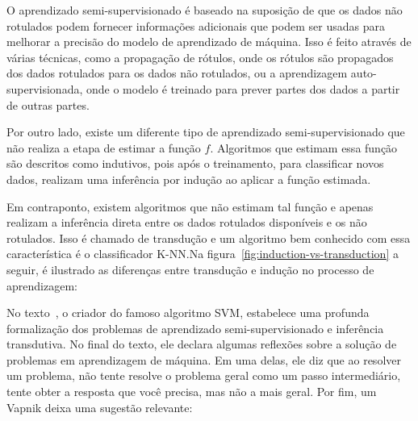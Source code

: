 O aprendizado semi-supervisionado é baseado na suposição de que os
dados não rotulados podem fornecer informações adicionais que podem
ser usadas para melhorar a precisão do modelo de aprendizado de
máquina. Isso é feito através de várias técnicas, como a propagação de
rótulos, onde os rótulos são propagados dos dados rotulados para os
dados não rotulados, ou a aprendizagem auto-supervisionada, onde o
modelo é treinado para prever partes dos dados a partir de outras
partes.

Por outro lado, existe um diferente tipo de aprendizado
semi-supervisionado que não realiza a etapa de estimar a função $ f
$. Algoritmos que estimam essa função são descritos como indutivos,
pois após o treinamento, para classificar novos dados, realizam uma
inferência por indução ao aplicar a função estimada.

Em contraponto, existem algoritmos que não estimam tal função e apenas
realizam a inferência direta entre os dados rotulados disponíveis e os
não rotulados. Isso é chamado de transdução e um algoritmo bem
conhecido com essa característica é o classificador K-NN.\@ Na
figura~\ref{fig:induction-vs-transduction} a seguir, é ilustrado as
diferenças entre transdução e indução no processo de aprendizagem:


\begin{figure}[h!]
        \captionsetup{width=12cm}
		\centering
\end{figure}


No texto~\cite{vapnik2006semi}, o criador do famoso algoritmo SVM,
estabelece uma profunda formalização dos problemas de aprendizado
semi-supervisionado e inferência transdutiva. No final do texto, ele declara
algumas reflexões sobre a solução de problemas em aprendizagem de
máquina. Em uma delas, ele diz que ao resolver um problema, não tente
resolve o problema geral como um passo intermediário, tente obter a
resposta que você precisa, mas não a mais geral. Por fim, um Vapnik
deixa uma sugestão relevante:



